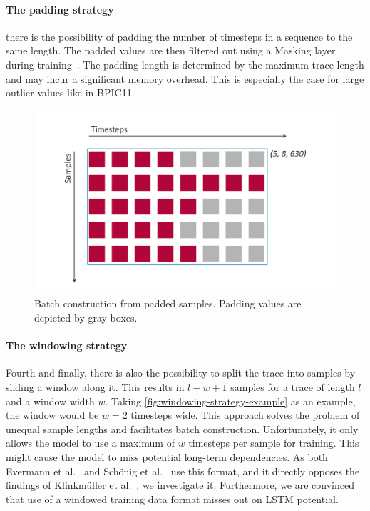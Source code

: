 \paragraph{The padding strategy}
 there is the possibility of padding the number of timesteps in a sequence to the same length.
The padded values are then filtered out using a Masking layer during training~\cite{web:keras}.
The padding length is determined by the maximum trace length and may incur a significant memory overhead.
This is especially the case for large outlier values like in BPIC11.

\begin{figure}[!htb]
    \centering
    \includegraphics[width=.9\textwidth]{gfx/padded-batching.pdf}
    \caption[Padding strategy for batches]{Batch construction from padded samples. Padding values are depicted by gray boxes.}
    \label{fig:padded-batching-example}
\end{figure}

\paragraph{The windowing strategy}
Fourth and finally, there is also the possibility to split the trace into samples by sliding a window along it.
This results in $l-w+1$ samples for a trace of length $l$ and a window width $w$.
Taking \autoref{fig:windowing-strategy-example} as an example, the window would be $w=2$ timesteps wide.
This approach solves the problem of unequal sample lengths and facilitates batch construction.
Unfortunately, it only allows the model to use a maximum of $w$ timesteps per sample for training.
This might cause the model to miss potential long-term dependencies.
As both Evermann et al.~\cite{evermann2016} and Schönig et al.~\cite{schoenig2018} use this format, and it directly opposes the findings of Klinkmüller et al.~\cite{klinkmuller2018reliablemonitoring}, we investigate it.
Furthermore, we are convinced that use of a windowed training data format misses out on LSTM potential.

